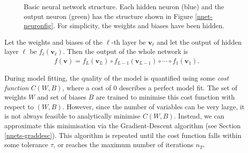 \begin{figure}[hb]
\caption{Basic neural network structure. Each hidden neuron (blue) and the output neuron (green) has the structure shown in Figure \ref{nnet-neuronfig}. For simplicity, the weights and biases have been hidden.}
\label{nnet-structurefig}
\end{figure}

Let the weights and biases of the $\ell$-th layer be $\mathbf{v}_\ell$ and let the output of hidden layer $\ell$ be $f_\ell(\mathbf{v}_\ell)$. Then the output of the whole network is
\begin{align}
	f(\mathbf{v}) = f_L(\mathbf{v}_L) \circ f_{L-1}(\mathbf{v}_{L-1}) \circ \cdots \circ f_1(\mathbf{v}_1).
\end{align}

During model fitting, the quality of the model is quantified using some \textit{cost function} $C(W,B)$, where a cost of 0 describes a perfect model fit. The set of weights $W$ and set of biases $B$ are trained to minimise this cost function with respect to $(W,B)$. However, since the number of variables can be very large, it is not always feasible to analytically minimise $C(W,B)$. Instead, we can approximate this minimisation via the Gradient-Descent algorithm (see Section \ref{nnets-graddesc}). This algorithm is repeated until the cost function falls within some tolerance $\tau$, or reaches the maximum number of iterations $n_T$.



